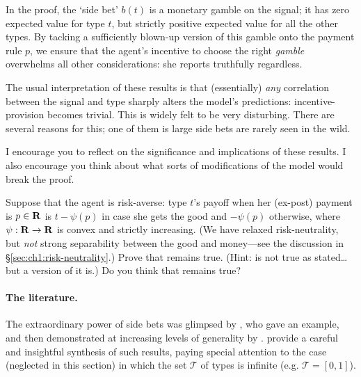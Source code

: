 In the proof, the `side bet' $b(t)$ is a monetary gamble on the signal; it has zero expected value for type $t$, but strictly positive expected value for all the other types.
By tacking a sufficiently blown-up version of this gamble onto the payment rule $p$,
we ensure that the agent's incentive to choose the right \emph{gamble} overwhelms all other considerations:
she reports truthfully regardless.

The usual interpretation of these results
is that (essentially) \emph{any} correlation between the signal and type sharply alters the model's predictions: incentive-provision becomes trivial.
This is widely felt to be very disturbing.
There are several reasons for this; one of them is large side bets are rarely seen in the wild.

I encourage you to reflect on the significance and implications of these results.
I also encourage you think about what sorts of modifications of the model would break the proof.


\begin{exercise}
	\label{exercise:CremerMclean_riskaversion}
	Suppose that the agent is risk-averse:
	type $t$'s payoff when her (ex-post) payment is $p \in \mathbf{R}$ is
	$t-\psi(p)$ in case she gets the good
	and $-\psi(p)$ otherwise,
	where $\psi : \mathbf{R} \to \mathbf{R}$ is convex and strictly increasing.
	(We have relaxed risk-neutrality, but \emph{not} strong separability between the good and money---see the discussion in §\ref{sec:ch1:risk-neutrality}.)
	Prove that  remains true.
	(Hint:  is not true as stated\dots but a version of it is.)
	Do you think that  remains true?
\end{exercise}

\paragraph{The literature.}
The extraordinary power of side bets was glimpsed by \textcite[§7]{Myerson1981}, who gave an example,
and then demonstrated at increasing levels of generality by \textcite{CremerMclean1985,CremerMclean1988,McafeeReny1992}.
\textcite{LopomoRigottiShannon2022} provide a careful and insightful synthesis of such results, paying special attention to the case (neglected in this section) in which the set $\mathcal{T}$ of types is infinite (e.g. $\mathcal{T}=[0,1]$).

